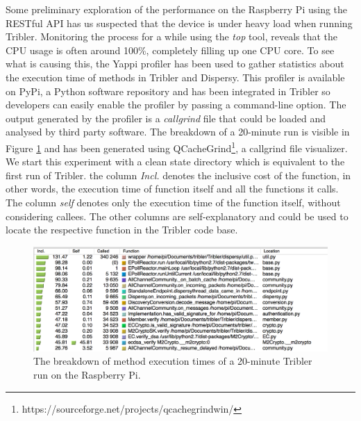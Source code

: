 Some preliminary exploration of the performance on the Raspberry Pi using the RESTful API has us suspected that the device is under heavy load when running Tribler. Monitoring the process for a while using the \emph{top} tool, reveals that the CPU usage is often around 100\%, completely filling up one CPU core. To see what is causing this, the Yappi profiler has been used to gather statistics about the execution time of methods in Tribler and Dispersy. This profiler is available on PyPi, a Python software repository and has been integrated in Tribler so developers can easily enable the profiler by passing a command-line option. The output generated by the profiler is a \emph{callgrind} file that could be loaded and analysed by third party software. The breakdown of a 20-minute run is visible in Figure \ref{fig:yappi_breakdown} and has been generated using QCacheGrind\footnote{https://sourceforge.net/projects/qcachegrindwin/}, a callgrind file visualizer. We start this experiment with a clean state directory which is equivalent to the first run of Tribler. the column \emph{Incl.} denotes the inclusive cost of the function, in other words, the execution time of function itself and all the functions it calls. The column \emph{self} denotes only the execution time of the function itself, without considering callees. The other columns are self-explanatory and could be used to locate the respective function in the Tribler code base.\\

\begin{figure}[!h]
	\centering
	\includegraphics[width=1.0\columnwidth]{images/experiments/yappi_breakdown}
	\caption{The breakdown of method execution times of a 20-minute Tribler run on the Raspberry Pi.}
	\label{fig:yappi_breakdown}
\end{figure}

